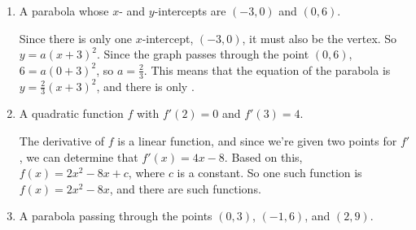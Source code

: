 \documentclass{article}
\begin{document}
\begin{enumerate}[resume]
\begin{enumerate}
  \item


    \begin{problem}[\vfill]
      A parabola whose $x$- and $y$-intercepts are $(-3, 0)$ and $(0, 6)$. 
    \end{problem}

    \begin{solution}
      Since there is only one $x$-intercept, $(-3, 0)$, it must
      also be the vertex. So $y=a(x+3)^2$. Since the graph
      passes through the point $(0,6)$, $6=a(0+3)^2$, so $a=\frac{2}{3}$.
      This means that the equation of the parabola is 
      $\boxed{y=\frac{2}{3}(x+3)^2}$, and
      there is only .
    \end{solution}

  \item


    \begin{problem}[\vfill]
      A quadratic function $f$ with $f'(2) = 0$ and $f'(3) = 4$.
    \end{problem}

    \begin{solution}
      The derivative of $f$ is a linear function, and since
      we're given two points for $f'$, we can determine that
      $f'(x)=4x-8$. Based on this, $f(x)=2x^2-8x+c$, where $c$
      is a constant. So one such function is $\boxed{f(x)=2x^2-8x}$,
      and there are  such functions.
    \end{solution}

  \item


    \begin{problem}[\vfill]
      A parabola passing through the points $(0, 3)$, $(-1, 6)$, and $(2,
      9)$.
    \end{problem}


\end{enumerate}
\end{enumerate}
\end{document}
